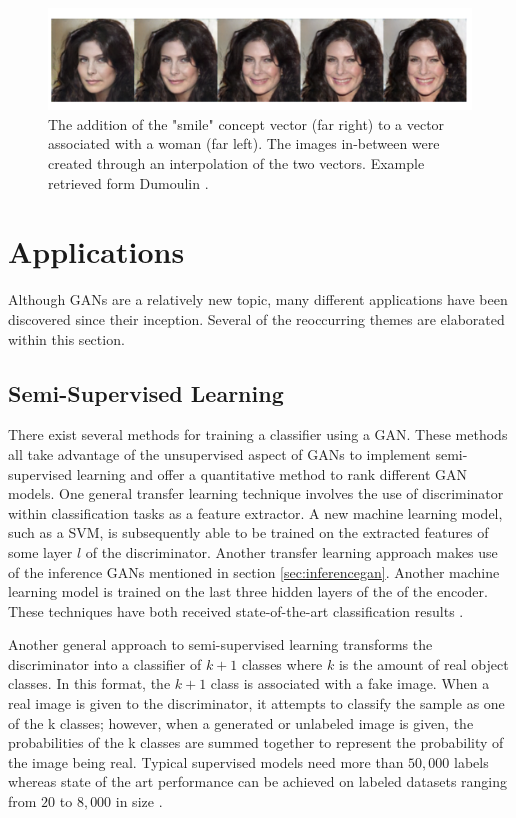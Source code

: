\documentclass[11pt]{article}
\begin{document}
\begin{figure}
\centering
\includegraphics[scale=0.45]{smile_concept_vector}
\caption{The addition of the "smile" concept vector (far right) to a vector associated with a woman (far left). The images in-between were created through an interpolation of the two vectors. Example retrieved form Dumoulin  \citep{2016arXiv160600704D}.}
\label{fig:conceptvector}
\end{figure}

\section{Applications}
Although GANs are a relatively new topic, many different applications have been discovered since their inception. Several of the reoccurring themes are elaborated within this section.

\subsection{Semi-Supervised Learning} \label{sec:semisupervised}
There exist several methods for training a classifier using a GAN. These methods all take advantage of the unsupervised aspect of GANs to implement semi-supervised learning and offer a quantitative method to rank different GAN models. One general transfer learning technique involves the use of discriminator within classification tasks as a feature extractor. A new machine learning model, such as a SVM, is subsequently able to be trained on the extracted features of some layer $l$ of the discriminator. Another transfer learning approach makes use of the inference GANs mentioned in section \ref{sec:inferencegan}. Another machine learning model is trained on the last three hidden layers of the of the encoder. These techniques have both received state-of-the-art classification results \citep{2017arXiv171007035C}.

Another general approach to semi-supervised learning transforms the discriminator into a classifier of $k + 1$ classes where $k$ is the amount of real object classes. In this format, the $k + 1$ class is associated with a fake image. When a real image is given to the discriminator, it attempts to classify the sample as one of the k classes; however, when a generated or unlabeled image is given, the probabilities of the k classes are summed together to represent the probability of the image being real. Typical supervised models need more than $50,000$ labels whereas state of the art performance can be achieved on labeled datasets ranging from $20$ to $8,000$ in size \citep{2017arXiv170100160G}.
\end{document}
